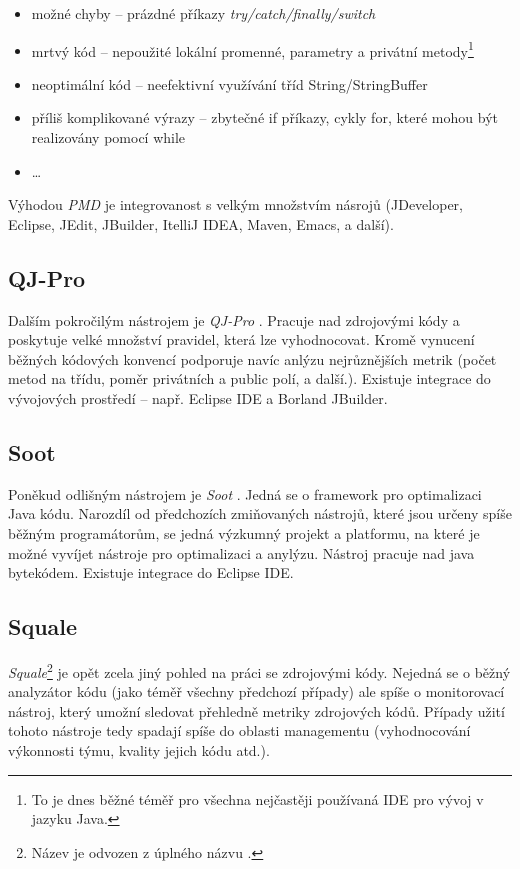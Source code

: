 \begin{itemize}
\item možné chyby -- prázdné příkazy \emph{try/catch/finally/switch}
\item mrtvý kód -- nepoužité lokální promenné, parametry a privátní metody\footnote{To je dnes běžné téměř pro všechna nejčastěji používaná IDE pro vývoj v jazyku Java.}
\item neoptimální kód -- neefektivní využívání tříd String/StringBuffer
\item příliš komplikované výrazy -- zbytečné if příkazy, cykly for, které mohou být realizovány pomocí while
\item \ldots
\end{itemize}

Výhodou \emph{PMD} je integrovanost s velkým množstvím násrojů (JDeveloper, Eclipse, JEdit, JBuilder, ItelliJ IDEA, Maven, Emacs, a další).

\subsection{QJ-Pro}
Dalším pokročilým nástrojem je \emph{QJ-Pro} \cite{existingtools:qjpro}. Pracuje nad zdrojovými kódy a poskytuje velké množství pravidel, která lze vyhodnocovat. Kromě vynucení běžných kódových konvencí podporuje navíc anlýzu nejrůznějších metrik (počet metod na třídu, poměr privátních a public polí, a další.). Existuje integrace do vývojových prostředí -- např. Eclipse IDE a Borland JBuilder.

\subsection{Soot}
Poněkud odlišným nástrojem je \emph{Soot} \cite{existingtools:soot}. Jedná se o framework pro optimalizaci Java kódu. Narozdíl od předchozích zmiňovaných nástrojů, které jsou určeny spíše běžným programátorům, se jedná výzkumný projekt a platformu, na které je možné vyvíjet nástroje pro optimalizaci a anylýzu. Nástroj pracuje nad java bytekódem. Existuje integrace do Eclipse IDE.

\subsection{Squale}
\emph{Squale}\footnote{Název je odvozen z úplného názvu .} \cite{existingtools:squale} je opět zcela jiný pohled na práci se zdrojovými kódy. Nejedná se o běžný analyzátor kódu (jako téměř všechny předchozí případy) ale spíše o monitorovací nástroj, který umožní sledovat přehledně metriky zdrojových kódů. Případy užití tohoto nástroje tedy spadají spíše do oblasti managementu (vyhodnocování výkonnosti týmu, kvality jejich kódu atd.).
